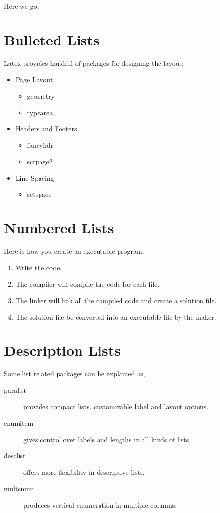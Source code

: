 \documentclass[12pt]{article}
\begin{document}
    Here we go.

    \section*{Bulleted Lists}

    Latex provides handful of packages for designing the layout:
    \begin{itemize}
        \item Page Layout
            \begin{itemize}
                \item geometry
                \item typearea
            \end{itemize}
        \item Headers and Footers
            \begin{itemize}
                \item fancyhdr
                \item scrpage2
            \end{itemize}
        \item Line Spacing
            \begin{itemize}
                \item setspace
            \end{itemize}
    \end{itemize}

    \section*{Numbered Lists}
    Here is how you create an executable program:
    \begin{enumerate}
        \item Write the code.
        \item The compiler will compile the code for each file.
        \item The linker will link all the compiled code and create a solution file.
        \item The solution file be converted into an executable file by the maker.
    \end{enumerate}

    \section*{Description Lists}
    Some list related packages can be explained as,
    \begin{description}
        \item[paralist] provides compact lists, customizable label and layout options.
        \item[enumitem] gives control over labels and lengths in all kinds of lists.
        \item[desclist] offers more flexibility in descriptive lists.
        \item[multenum] produces vertical enumeration in multiple columns.
    \end{description}
\end{document}
